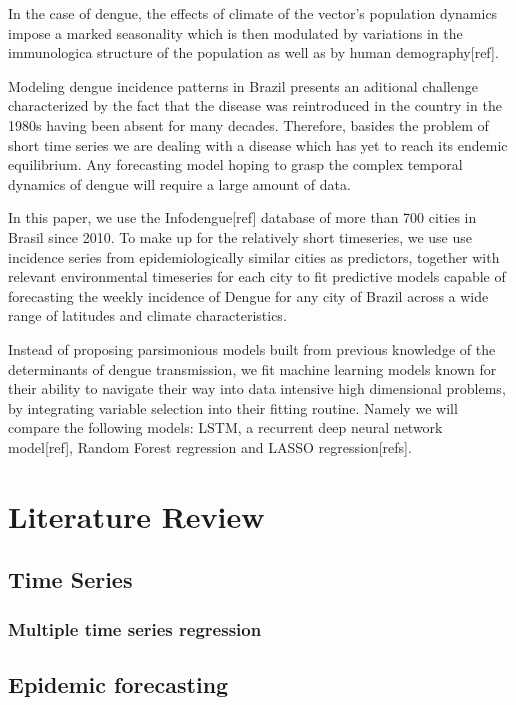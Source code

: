 \documentclass[12pt]{report}
\begin{document}
In the case of dengue, the effects of climate of the vector's population dynamics impose a marked seasonality which is then modulated by variations in the immunologica structure of the population as well as by human demography[ref].

Modeling dengue incidence patterns in Brazil presents an aditional challenge characterized by the fact that the disease was reintroduced in the country in the 1980s having been absent for many decades. Therefore, basides the problem of short time series we are dealing with a disease which has yet to reach its endemic equilibrium. Any forecasting model hoping to grasp the complex temporal dynamics of dengue will require a large amount of data.

In this paper, we use the Infodengue[ref] database of more than 700 cities in Brasil since 2010. To make up for the relatively short timeseries, we use use incidence series from epidemiologically similar cities as predictors, together with relevant environmental timeseries for each city to fit predictive models capable of forecasting the weekly incidence of Dengue for any city of Brazil across a wide range of latitudes and climate characteristics.

Instead of proposing parsimonious models built from previous knowledge of the determinants of dengue transmission, we fit machine learning models known for their ability to navigate their way into data intensive high dimensional problems, by integrating variable selection into their fitting routine. Namely we will compare the following models: LSTM, a recurrent deep neural network model[ref], Random Forest regression and LASSO regression[refs].

\newpage
\chapter{Literature Review}

\section{Time Series}
\subsection{Multiple time series regression}


\section{Epidemic forecasting}
 
\end{document}
